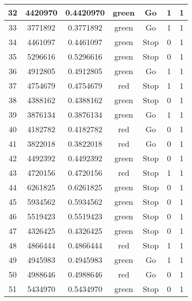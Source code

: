 \documentclass{jlreq}
\numberwithin{equation}{section}
\begin{document}
\begin{table}[H]
{\begin{tabular}{|c|c|c|c|c|c|c|}
      32           & 4420970          & 0.4420970      & green & Go   & 1     & 1   \\ \hline
      33           & 3771892          & 0.3771892      & green & Go   & 1     & 1   \\ \hline
      34           & 4461097          & 0.4461097      & green & Stop & 0     & 1   \\ \hline
      35           & 5296616          & 0.5296616      & green & Stop & 0     & 1   \\ \hline
      36           & 4912805          & 0.4912805      & green & Go   & 1     & 1   \\ \hline
      37           & 4754679          & 0.4754679      & red   & Stop & 1     & 1   \\ \hline
      38           & 4388162          & 0.4388162      & green & Stop & 0     & 1   \\ \hline
      39           & 3876134          & 0.3876134      & green & Go   & 1     & 1   \\ \hline
      40           & 4182782          & 0.4182782      & red   & Go   & 0     & 1   \\ \hline
      41           & 3822018          & 0.3822018      & red   & Go   & 0     & 1   \\ \hline
      42           & 4492392          & 0.4492392      & green & Stop & 0     & 1   \\ \hline
      43           & 4720156          & 0.4720156      & red   & Stop & 1     & 1   \\ \hline
      44           & 6261825          & 0.6261825      & green & Stop & 0     & 1   \\ \hline
      45           & 5934562          & 0.5934562      & green & Stop & 0     & 1   \\ \hline
      46           & 5519423          & 0.5519423      & green & Stop & 0     & 1   \\ \hline
      47           & 4326425          & 0.4326425      & green & Stop & 0     & 1   \\ \hline
      48           & 4866444          & 0.4866444      & red   & Stop & 1     & 1   \\ \hline
      49           & 4945983          & 0.4945983      & green & Go   & 1     & 1   \\ \hline
      50           & 4988646          & 0.4988646      & red   & Go   & 0     & 1   \\ \hline
      51           & 5434970          & 0.5434970      & green & Stop & 0     & 1   \\ \hline

\end{tabular}}
\end{table}
\end{document}
